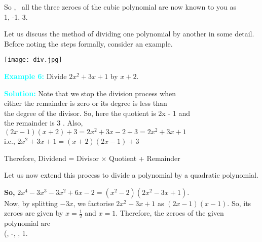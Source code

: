 \documentclass[12pt]{article}
\begin{document}
\hspace{2em}  So , \ all the three zeroes of the cubic polynomial are now known to you as 
\\ 1, -1, 3.  

\hspace{2em}Let us discuss the method of dividing one polynomial by another in some detail. Before noting the steps formally, consider an example.  

\vspace{1em}
\begin{flushright}
\vspace{-3em}\texttt{[image: div.jpg]} 
\end{flushright}
\vspace{-13em}
\textcolor{cyan}{\textbf{Example 6:}} Divide \(2x^2+3x+1\) by \(x+2\).

\textcolor{cyan}{\textbf{Solution:}} Note that we stop the division process when 
\\ either the remainder is zero or its degree is less than 
\\ the degree of the divisor. So, here the quotient is 2x - 1 and
\\  the remainder is 3 . Also,  \\
\hspace{1.8em} \((2x - 1)(x + 2) + 3 = 2x^2 + 3x - 2 + 3 = 2x^2 + 3x + 1\)
\\  i.e., \hspace{0.5em} \(2x^2 + 3x + 1 = (x + 2)(2x - 1) + 3\)

Therefore, Dividend = Divisor × Quotient + Remainder  

Let us now extend this process to divide a polynomial by a quadratic polynomial.
\newpage
{}
\vspace{-1em}


\textbf{So, } \(2x^4 - 3x^3 - 3x^2 + 6x - 2 = (x^2 - 2)(2x^2 - 3x + 1).\)
\vspace{1em} \\ Now, by splitting $-3x$, we factorise $2x^2 - 3x + 1$ as $(2x - 1)(x - 1)$. So, its zeroes 
\vspace{1em} are given by $x = \frac{1}{2}$ and $x = 1$. Therefore, the zeroes of the given polynomial are 
\vspace{1em} \\ (, \quad -, \quad {}, \quad {} 1.\)
\end{document}
